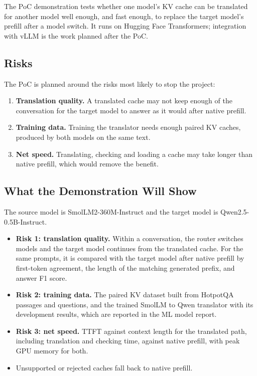 \documentclass{article}
\begin{document}
The PoC demonstration tests whether one model's KV cache can be
translated for another model well enough, and fast enough, to replace the
target model's prefill after a model switch. It runs on Hugging Face
Transformers; integration with vLLM is the work planned after the PoC.

\subsection{Risks}

The PoC is planned around the risks most likely to stop the project:

\begin{enumerate}
  \item \textbf{Translation quality.} A translated cache may not keep
  enough of the conversation for the target model to answer as it would
  after native prefill.
  \item \textbf{Training data.} Training the translator needs enough paired
  KV caches, produced by both models on the same text.
  \item \textbf{Net speed.} Translating, checking and loading a cache may
  take longer than native prefill, which would remove the benefit.
\end{enumerate}

\subsection{What the Demonstration Will Show}

The source model is SmolLM2-360M-Instruct and the target model is
Qwen2.5-0.5B-Instruct.

\begin{itemize}
  \item \textbf{Risk 1: translation quality.} Within a conversation, the
  router switches models and the target model continues from the
  translated cache. For the same prompts, it is compared with the target
  model after native prefill by first-token agreement, the length of the
  matching generated prefix, and answer F1 score.
  \item \textbf{Risk 2: training data.} The paired KV dataset built from
  HotpotQA passages and questions, and the trained SmolLM to Qwen
  translator with its development results, which are reported in the ML
  model report.
  \item \textbf{Risk 3: net speed.} TTFT against context length for the
  translated path, including translation and checking time, against native
  prefill, with peak GPU memory for both.
  \item Unsupported or rejected caches fall back to native prefill.
\end{itemize}
\end{document}
